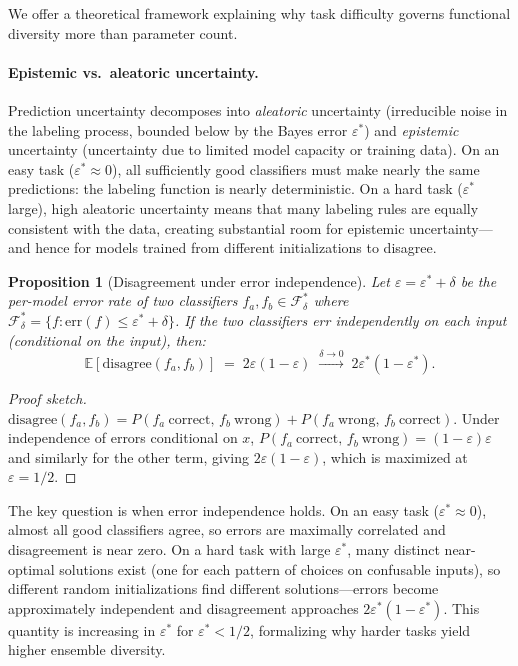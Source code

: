 \documentclass[11pt]{article}
\newtheorem{proposition}{Proposition}
\begin{document}
We offer a theoretical framework explaining why task difficulty governs
functional diversity more than parameter count.

\paragraph{Epistemic vs.\ aleatoric uncertainty.}
Prediction uncertainty decomposes into \emph{aleatoric} uncertainty
(irreducible noise in the labeling process, bounded below by the Bayes
error $\varepsilon^*$) and \emph{epistemic} uncertainty (uncertainty due
to limited model capacity or training data).  On an easy task
($\varepsilon^* \approx 0$), all sufficiently good classifiers must
make nearly the same predictions: the labeling function is nearly
deterministic.  On a hard task ($\varepsilon^*$ large), high aleatoric
uncertainty means that many labeling rules are equally consistent with
the data, creating substantial room for epistemic uncertainty—and hence
for models trained from different initializations to disagree.

\begin{proposition}[Disagreement under error independence]
\label{prop:multiplicity}
Let $\varepsilon = \varepsilon^* + \delta$ be the per-model error rate of
two classifiers $f_a, f_b \in \mathcal{F}^*_\delta$ where
$\mathcal{F}^*_\delta = \{f : \mathrm{err}(f) \leq \varepsilon^* + \delta\}$.
If the two classifiers err independently on each input (conditional on
the input), then:
\[
  \mathbb{E}[\mathrm{disagree}(f_a, f_b)]
  \;=\; 2\varepsilon(1 - \varepsilon)
  \;\xrightarrow{\delta\to 0}\; 2\varepsilon^*(1 - \varepsilon^*).
\]
\end{proposition}

\begin{proof}[Proof sketch]
$\mathrm{disagree}(f_a, f_b) = P(f_a \mathrm{\ correct},\, f_b \mathrm{\ wrong}) + P(f_a \mathrm{\ wrong},\, f_b \mathrm{\ correct})$.
Under independence of errors conditional on $x$, $P(f_a \mathrm{\ correct},\, f_b \mathrm{\ wrong}) = (1-\varepsilon)\varepsilon$ and similarly for the other term, giving $2\varepsilon(1-\varepsilon)$, which is maximized at $\varepsilon = 1/2$.
\end{proof}

\noindent The key question is when error independence holds.  On an easy
task ($\varepsilon^* \approx 0$), almost all good classifiers agree, so errors
are maximally correlated and disagreement is near zero.  On a hard task with
large $\varepsilon^*$, many distinct near-optimal solutions exist (one for
each pattern of choices on confusable inputs), so different random
initializations find different solutions---errors become approximately
independent and disagreement approaches $2\varepsilon^*(1-\varepsilon^*)$.
This quantity is increasing in $\varepsilon^*$ for $\varepsilon^* < 1/2$,
formalizing why harder tasks yield higher ensemble diversity.
\end{document}
